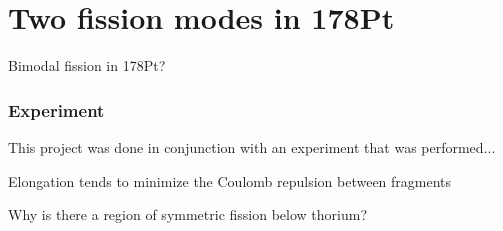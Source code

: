 \chapter{Two fission modes in 178Pt}

\maketitle
Bimodal fission in 178Pt?

\subsection{Experiment}
This project was done in conjunction with an experiment that was performed...

Elongation tends to minimize the Coulomb repulsion between fragments

Why is there a region of symmetric fission below thorium?
